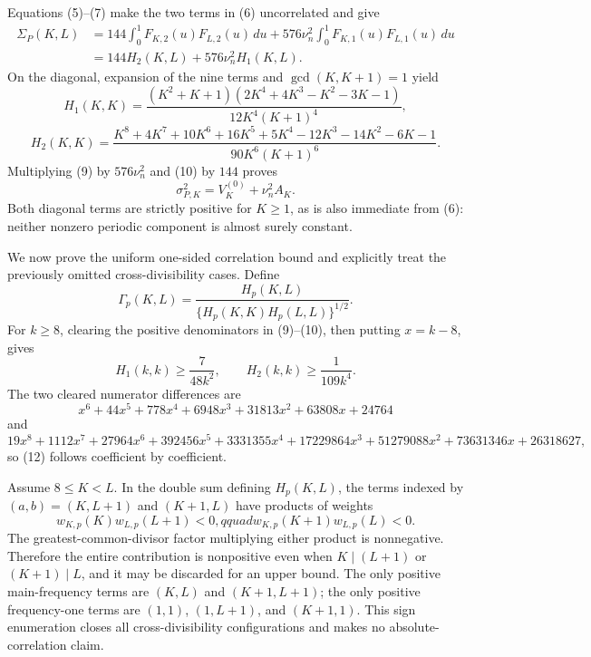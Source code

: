 Equations (5)--(7) make the two terms in (6) uncorrelated and give
\[
 \begin{aligned}
 \Sigma_P(K,L)
 &=144\int_0^1F_{K,2}(u)F_{L,2}(u)\,du
 +576\nu_n^2\int_0^1F_{K,1}(u)F_{L,1}(u)\,du\\
 &=144H_2(K,L)+576\nu_n^2H_1(K,L).
 \end{aligned}                                                                    \tag{8}
\]
On the diagonal, expansion of the nine terms and \(\gcd(K,K+1)=1\) yield
\[
 H_1(K,K)=\frac{(K^2+K+1)(2K^4+4K^3-K^2-3K-1)}{12K^4(K+1)^4},                  \tag{9}
\]
\[
 H_2(K,K)=\frac{K^8+4K^7+10K^6+16K^5+5K^4-12K^3-14K^2-6K-1}
 {90K^6(K+1)^6}.                                                                 \tag{10}
\]
Multiplying (9) by \(576\nu_n^2\) and (10) by \(144\) proves
\[
 \sigma_{P,K}^2=V_K^{(0)}+\nu_n^2A_K.                                           \tag{11}
\]
Both diagonal terms are strictly positive for \(K\geq1\), as is also immediate from (6): neither nonzero periodic component is almost surely constant.

We now prove the uniform one-sided correlation bound and explicitly treat the previously omitted cross-divisibility cases.  Define
\[
 \Gamma_p(K,L)=\frac{H_p(K,L)}{\{H_p(K,K)H_p(L,L)\}^{1/2}}.
\]
For \(k\geq8\), clearing the positive denominators in (9)--(10), then putting \(x=k-8\), gives
\[
 H_1(k,k)\geq\frac7{48k^2},\qquad H_2(k,k)\geq\frac1{109k^4}.                  \tag{12}
\]
The two cleared numerator differences are
\[
 x^6+44x^5+778x^4+6948x^3+31813x^2+63808x+24764
\]
and
\[
 19x^8+1112x^7+27964x^6+392456x^5+3331355x^4+17229864x^3
 +51279088x^2+73631346x+26318627,
\]
so (12) follows coefficient by coefficient.

Assume \(8\leq K<L\).  In the double sum defining \(H_p(K,L)\), the terms indexed by \((a,b)=(K,L+1)\) and \((K+1,L)\) have products of weights
\[
 w_{K,p}(K)w_{L,p}(L+1)<0,qquad
 w_{K,p}(K+1)w_{L,p}(L)<0.                                                       \tag{13}
\]
The greatest-common-divisor factor multiplying either product is nonnegative.  Therefore the entire contribution is nonpositive even when \(K\mid(L+1)\) or \((K+1)\mid L\), and it may be discarded for an upper bound.  The only positive main-frequency terms are \((K,L)\) and \((K+1,L+1)\); the only positive frequency-one terms are \((1,1)\), \((1,L+1)\), and \((K+1,1)\).  This sign enumeration closes all cross-divisibility configurations and makes no absolute-correlation claim.

